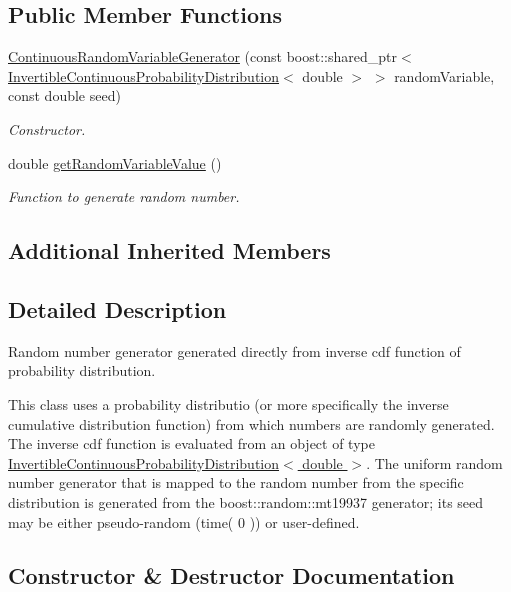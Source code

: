 \subsection*{Public Member Functions}
\begin{DoxyCompactItemize}
\item 
\hyperlink{classtudat_1_1statistics_1_1ContinuousRandomVariableGenerator_ab6ec450c7016de46176d102539ace288}{Continuous\+Random\+Variable\+Generator} (const boost\+::shared\+\_\+ptr$<$ \hyperlink{classtudat_1_1statistics_1_1InvertibleContinuousProbabilityDistribution}{Invertible\+Continuous\+Probability\+Distribution}$<$ double $>$ $>$ random\+Variable, const double seed)
\begin{DoxyCompactList}\small\item\em Constructor. \end{DoxyCompactList}\item 
double \hyperlink{classtudat_1_1statistics_1_1ContinuousRandomVariableGenerator_a91d2ccdbad16f47c24ec8d97e6aa53c3}{get\+Random\+Variable\+Value} ()
\begin{DoxyCompactList}\small\item\em Function to generate random number. \end{DoxyCompactList}\end{DoxyCompactItemize}
\subsection*{Additional Inherited Members}


\subsection{Detailed Description}
Random number generator generated directly from inverse cdf function of probability distribution. 

This class uses a probability distributio (or more specifically the inverse cumulative distribution function) from which numbers are randomly generated. The inverse cdf function is evaluated from an object of type \hyperlink{classtudat_1_1statistics_1_1InvertibleContinuousProbabilityDistribution}{Invertible\+Continuous\+Probability\+Distribution$<$ double $>$}. The uniform random number generator that is mapped to the random number from the specific distribution is generated from the boost\+::random\+::mt19937 generator; its seed may be either pseudo-\/random (time( 0 )) or user-\/defined. 

\subsection{Constructor \& Destructor Documentation}
